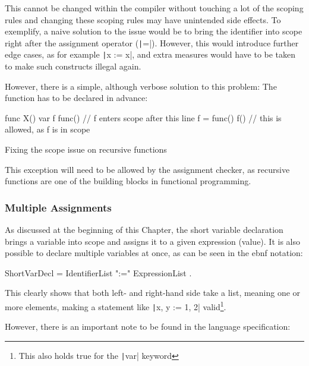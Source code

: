 This cannot be changed within the compiler without touching a lot of the scoping
rules and changing these scoping rules may have unintended side effects. To exemplify,
a naive solution to the issue would be to bring the identifier into scope right after the
assignment operator (\texttt|=|). However, this would introduce further
edge cases, as for example \texttt|x := x|, and extra measures would have
to be taken to make such constructs illegal again.

However, there is a simple, although verbose solution to this problem: The function
has to be declared in advance:

\begin{listing}
	\begin{gocode}
func X() {
	var f func() // f enters scope after this line
	f = func() {
		f() // this is allowed, as f is in scope
	}
}
\end{gocode}
	\caption{Fixing the scope issue on recursive functions}
\end{listing}
This exception will need to be allowed by the assignment checker, as recursive functions
are one of the building blocks in functional programming.

\subsubsection{Multiple Assignments}\label{sec:multi-assign}


As discussed at the beginning of this Chapter, the short variable declaration brings
a variable into scope and assigns it to a given expression (value). It is also
possible to declare multiple variables at once, as can be seen in the \gls{ebnf}
notation:
\begin{listing}
	\begin{bnfcode}
ShortVarDecl = IdentifierList ":=" ExpressionList .
	\end{bnfcode}
\end{listing}
This clearly shows that both left- and right-hand side take a list, meaning one or more
elements, making a statement like \texttt|x, y := 1, 2| valid\footnote{This also
	holds true for the \texttt|var| keyword}.

However, there is an important note to be found in the language specification:

